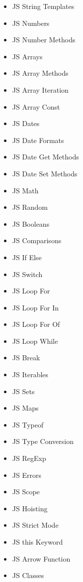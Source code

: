 \documentclass[12pt, letterpaper]{article}
\begin{document}
\begin{enumerate}
\begin{itemize}
\begin{enumerate}
\begin{itemize}
                \item JS String Templates
                \item JS Numbers
                \item JS Number Methods
                \item JS Arrays
                \item JS Array Methods
                \item JS Array Iteration
                \item JS Array Const
                \item JS Dates
                \item JS Date Formats
                \item JS Date Get Methods
                \item JS Date Set Methods
                \item JS Math
                \item JS Random
                \item JS Booleans
                \item JS Comparisons
                \item JS If Else
                \item JS Switch
                \item JS Loop For
                \item JS Loop For In
                \item JS Loop For Of
                \item JS Loop While
                \item JS Break
                \item JS Iterables
                \item JS Sets
                \item JS Maps
                \item JS Typeof
                \item JS Type Conversion
                \item JS RegExp
                \item JS Errors
                \item JS Scope
                \item JS Hoisting
                \item JS Strict Mode
                \item JS this Keyword
                \item JS Arrow Function
                \item JS Classes

\end{itemize}
\end{enumerate}
\end{itemize}
\end{enumerate}
\end{document}
